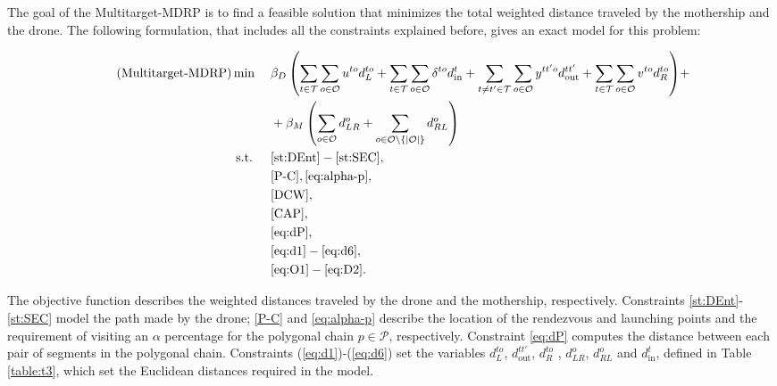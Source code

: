 \documentclass{itor}
\theoremstyle{definition}
\theoremstyle{remark}
\def\AMD{{\sf Multitarget-MDRP\xspace}}
\begin{document}
\noindent
The goal of the \AMD\xspace is to find a feasible solution that minimizes the total weighted distance traveled by the mothership and the drone. The following formulation, that includes all the constraints explained before, gives an exact model for this problem:

\begin{align*}\label{Multi-MDRP} \tag{Multitarget-MDRP}
\min\quad \; & {\beta_D\left(\sum_{t\in \mathcal T}\sum_{o\in \mathcal O} u^{to}d_L^{to} + \sum_{t\in \mathcal T}\sum_{o\in \mathcal O}\delta^{to}d_{\text{in}}^t + \sum_{t\neq t'\in\mathcal T}\sum_{o\in \mathcal O}y^{tt'o}d_{\text{out}}^{tt'} + \sum_{t\in \mathcal T} \sum_{o\in \mathcal O}v^{to}d_R^{to}\right)} + \\
& + {\beta_M\left(\sum_{o\in\mathcal O}d_{LR}^o+\sum_{o\in \mathcal O\setminus\{|\mathcal O|\}} d_{RL}^o\right)}\\
\mbox{s.t. }\quad & \eqref{st:DEnt}-\eqref{st:SEC},\\
    & \eqref{P-C}, \eqref{eq:alpha-p},\\
	& \eqref{DCW},\\
	& \eqref{CAP}, \\
	& \eqref{eq:dP} \label{dis-zeta-y},\\
	& \eqref{eq:d1}-\eqref{eq:d6},\\
	& \eqref{eq:O1}-\eqref{eq:D2}.
\end{align*}

\noindent
The objective function describes the weighted distances traveled by the drone and the mothership, respectively. Constraints \eqref{st:DEnt}-\eqref{st:SEC} model the path made by the drone; \eqref{P-C} and \eqref{eq:alpha-p} describe the location of the rendezvous and launching points and the requirement of visiting an $\alpha$ percentage for the polygonal chain $p\in\mathcal P$, respectively. Constraint \eqref{eq:dP} computes the distance between each pair of segments in the polygonal chain. Constraints (\ref{eq:d1})-(\ref{eq:d6}) set the variables $d_L^{to}$, $d_{\text{out}}^{tt'}$, $d_R^{to}$ , $d_{LR}^o$, $d_{RL}^o$ and $d_{\text{in}}^{t}$, defined in Table \ref{table:t3}, which set the Euclidean distances required in the model. \\
\end{document}
